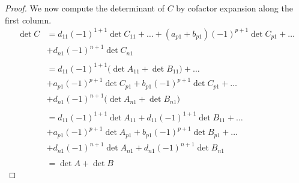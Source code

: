 \documentclass{ximera}
\begin{document}
\begin{proof}
We now compute the determinant of $C$ by cofactor expansion along the first column.
\begin{align*}
\det{C}&=d_{11}(-1)^{1+1}\det{C_{11}}+\ldots +(a_{p1}+b_{p1})(-1)^{p+1}\det{C_{p1}}+\ldots\\
&+d_{n1}(-1)^{n+1}\det{C_{n1}}\\
\\
&=d_{11}(-1)^{1+1}\Big(\det{A_{11}}+\det{B_{11}}\Big)+\ldots\\
&+a_{p1}(-1)^{p+1}\det{C_{p1}}+b_{p1}(-1)^{p+1}\det{C_{p1}}+\ldots\\
&+d_{n1}(-1)^{n+1}\Big(\det{A_{n1}}+\det{B_{n1}}\Big)\\
\\
&=d_{11}(-1)^{1+1}\det{A_{11}}+d_{11}(-1)^{1+1}\det{B_{11}}+\ldots\\
&+a_{p1}(-1)^{p+1}\det{A_{p1}}+b_{p1}(-1)^{p+1}\det{B_{p1}}+\ldots\\
&+d_{n1}(-1)^{n+1}\det{A_{n1}}+d_{n1}(-1)^{n+1}\det{B_{n1}}\\
\\
&=\det{A}+\det{B}
\end{align*}
\end{proof}
\end{document}
